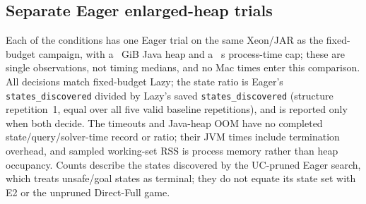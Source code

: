 \subsection{Separate Eager enlarged-heap trials}
\label{supp:vthree-ext-seven}
Each of the \VThreeExtSevenTrials{} conditions has one Eager trial on the same Xeon/JAR as the fixed-budget campaign, with a \VThreeExtSevenHeap{}~GiB Java heap and a \VThreeExtSevenCap{}~s process-time cap; these are single observations, not timing medians, and no Mac times enter this comparison.
All \VThreeExtSevenAgree{} decisions match fixed-budget Lazy; the state ratio is Eager's \texttt{states\_discovered} divided by Lazy's saved \texttt{states\_discovered} (structure repetition~1, equal over all five valid baseline repetitions), and is reported only when both decide.
The \VThreeExtSevenTO{} timeouts and \VThreeExtSevenOOM{} Java-heap OOM have no completed state/query/solver-time record or ratio; their JVM times include termination overhead, and sampled working-set RSS is process memory rather than heap occupancy.
Counts describe the states discovered by the UC-pruned Eager search, which treats unsafe/goal states as terminal; they do not equate its state set with E2 or the unpruned Direct-Full game.

